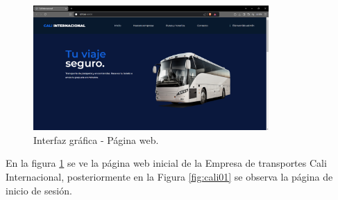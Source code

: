 	
	\begin{figure}[!h] %
		\caption[Interfaz gráfica - Página web]
		{\newline Interfaz gráfica - Página web.} %
		\centering
		\includegraphics[width=0.8\textwidth]{imagenes/cap_3/Img_calibus/CALIBUS00.png} %
		
		\begin{flushleft}
		\end{flushleft}
		\vspace{-16pt}
		\label{fig:cali00} %
	\end{figure}
	
	\vspace{-0.6cm} %
	
	En la figura \ref{fig:cali00} se ve la página web inicial de la Empresa de transportes Cali Internacional, posteriormente en la Figura \ref{fig:cali01} se observa la página de inicio de sesión.
	
	\vspace{0.3cm} %
	
